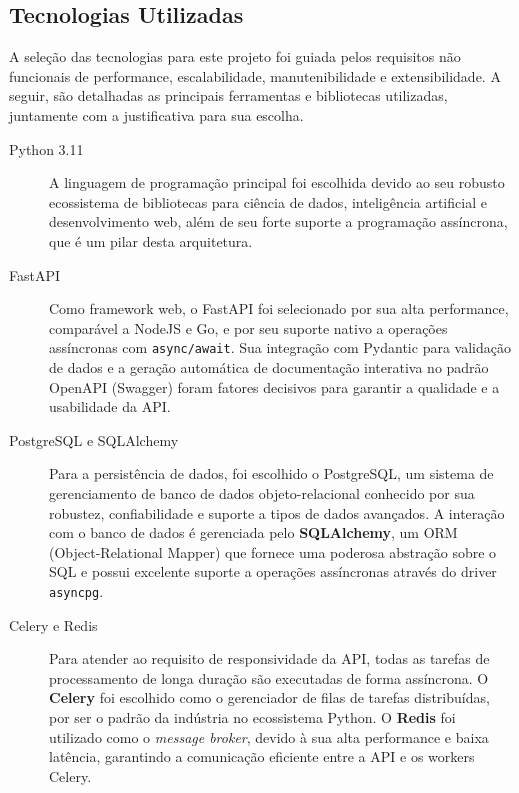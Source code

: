 \subsection{Tecnologias Utilizadas}
\label{sec:tecnologias}

A seleção das tecnologias para este projeto foi guiada pelos requisitos não funcionais de performance, escalabilidade, manutenibilidade e extensibilidade. A seguir, são detalhadas as principais ferramentas e bibliotecas utilizadas, juntamente com a justificativa para sua escolha.

\begin{description}
    \item[Python 3.11] A linguagem de programação principal foi escolhida devido ao seu robusto ecossistema de bibliotecas para ciência de dados, inteligência artificial e desenvolvimento web, além de seu forte suporte a programação assíncrona, que é um pilar desta arquitetura.

    \item[FastAPI] Como framework web, o FastAPI foi selecionado por sua alta performance, comparável a NodeJS e Go, e por seu suporte nativo a operações assíncronas com \texttt{async/await}. Sua integração com Pydantic para validação de dados e a geração automática de documentação interativa no padrão OpenAPI (Swagger) foram fatores decisivos para garantir a qualidade e a usabilidade da API.

    \item[PostgreSQL e SQLAlchemy] Para a persistência de dados, foi escolhido o PostgreSQL, um sistema de gerenciamento de banco de dados objeto-relacional conhecido por sua robustez, confiabilidade e suporte a tipos de dados avançados. A interação com o banco de dados é gerenciada pelo \textbf{SQLAlchemy}, um ORM (Object-Relational Mapper) que fornece uma poderosa abstração sobre o SQL e possui excelente suporte a operações assíncronas através do driver \texttt{asyncpg}.

    \item[Celery e Redis] Para atender ao requisito de responsividade da API, todas as tarefas de processamento de longa duração são executadas de forma assíncrona. O \textbf{Celery} foi escolhido como o gerenciador de filas de tarefas distribuídas, por ser o padrão da indústria no ecossistema Python. O \textbf{Redis} foi utilizado como o \textit{message broker}, devido à sua alta performance e baixa latência, garantindo a comunicação eficiente entre a API e os workers Celery.


\end{description}
